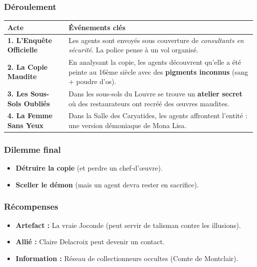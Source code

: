 \documentclass[10pt,a5paper,twoside]{book}
\begin{document}
\subsubsection*{Déroulement}
\begin{center}
	\begin{tabular}{|P{3cm}|P{9cm}|}
	\hline
	\textbf{Acte} 						& \textbf{Événements clés} \\ \hline
	\textbf{1. L'Enquête Officielle}	& Les agents sont envoyés sous couverture de \textit{consultants en sécurité}. La police pense à un vol organisé. \\ \hline
	\textbf{2. La Copie Maudite}		& En analysant la copie, les agents découvrent qu'elle a été peinte au 16ème siècle avec des \textbf{pigments inconnus} (sang + poudre d'os). \\ \hline
	\textbf{3. Les Sous-Sols Oubliés}	& Dans les sous-sols du Louvre se trouve un \textbf{atelier secret} où des restaurateurs ont recréé des œuvres maudites. \\ \hline
	\textbf{4. La Femme Sans Yeux}		& Dans la Salle des Caryatides, les agents affrontent l'entité : une version démoniaque de Mona Lisa. \\ \hline
	\end{tabular}
\end{center}

\subsubsection*{Dilemme final}

\begin{itemize}
	\item \textbf{Détruire la copie} (et perdre un chef-d'œuvre).
	\item \textbf{Sceller le démon} (mais un agent devra rester en sacrifice).
\end{itemize}

\subsubsection*{Récompenses}
\begin{itemize}
	\item \textbf{Artefact :} La vraie Joconde (peut servir de talisman contre les illusions).
	\item \textbf{Allié :} Claire Delacroix peut devenir un contact.
	\item \textbf{Information :} Réseau de collectionneurs occultes (Comte de Montclair).
\end{itemize}
\end{document}
